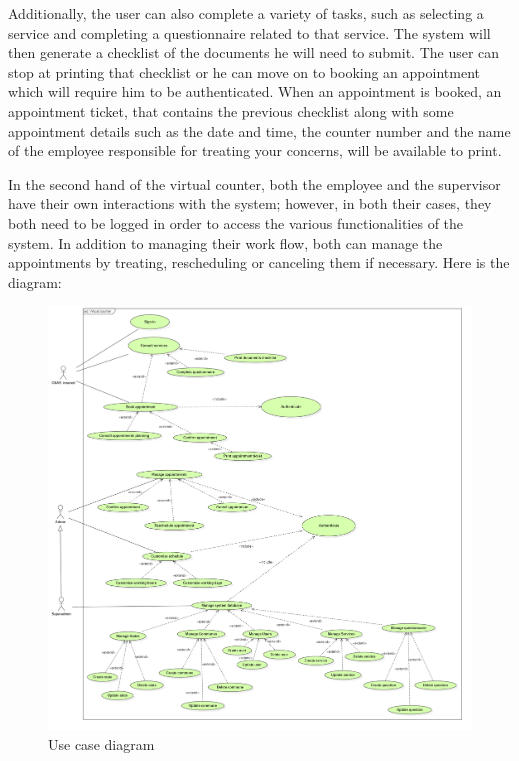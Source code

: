  Additionally, the user can also complete a variety of tasks, such as selecting a service and completing a questionnaire related to that service. The system will then generate a checklist of the documents he will need to submit. The user can stop at printing that checklist or he can move on to booking an appointment which will require him to be authenticated. When an appointment is booked, an appointment ticket, that contains the previous checklist along with some appointment details such as the date and time, the counter number and the name of the employee responsible for treating your concerns,  will be available to print. 
 
 \medskip In the second hand of the virtual counter, both the employee and the supervisor have their own interactions with the system; however, in both their cases, they both need to be logged in order to access the various functionalities of the system. In addition to managing their work flow, both can manage the appointments by treating, rescheduling or canceling them if necessary. 
\newpage
 \medskip Here is the diagram:

 \begin{figure}[H]
    \centering
    \includegraphics[width=1.0\textwidth]{UseCase.PNG}
    \caption{Use case diagram}
    \label{ucdiagram}
 \end{figure}
 
